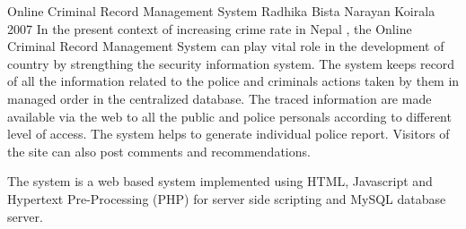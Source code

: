  \begin{conf-abstract}[]
{Online Criminal Record Management System }
{
Radhika Bista
Narayan Koirala
}
{ 2007 }
In the present context of increasing crime rate in Nepal , the Online Criminal Record Management System can play vital role in the development of country by strengthing the security information system. The system keeps record of all the information related to the police and criminals actions taken by them in managed order in the centralized database. The traced information are made available via the web to all the public and police personals according to different level of access. The system helps to generate individual police report. Visitors of the site can also post comments and recommendations.

The system is a web based system implemented using HTML, Javascript and Hypertext Pre-Processing (PHP) for server side scripting and MySQL database server.
  \end{conf-abstract}